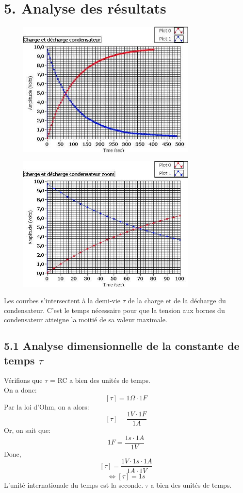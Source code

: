 \documentclass{report}
\begin{document}
\section*{5. Analyse des r\'esultats}
\begin{figure}[ht!]
\centering
\includegraphics[width=90mm]{analyse2.jpg}
\label{overflow}
\end{figure}
\begin{figure}[ht!]
\centering
\includegraphics[width=90mm]{analyse1.jpg}
\label{overflow}
\end{figure}
\hspace*{0.5cm}
Les courbes s'intersectent \`a la demi-vie $\tau$ de la charge et de la d\'echarge du condensateur. C'est le temps n\'ecessaire pour que la tension aux bornes du condensateur atteigne la moiti\'e de sa valeur maximale.
\subsection*{5.1 Analyse dimensionnelle de la constante de temps $\tau$ }
V\'erifions que $\tau$ = RC a bien des unit\'es de temps.
\\
On a donc:
   $$[\tau] = 1\Omega \cdot 1F$$
Par la loi d'Ohm, on a alors:
   $$[\tau] = \frac{1V \cdot 1F}{1A}$$
Or, on sait que:
   $$1F = \frac{1s \cdot 1A}{1V}$$
Donc,
   $$[\tau] = \frac{1V \cdot 1s \cdot 1A}{1A \cdot 1V}$$
  $$\Leftrightarrow [\tau] = 1s$$
L'unit\'e internationale du temps est la seconde. $\tau$ a bien des unit\'es de temps.  
\end{document}
